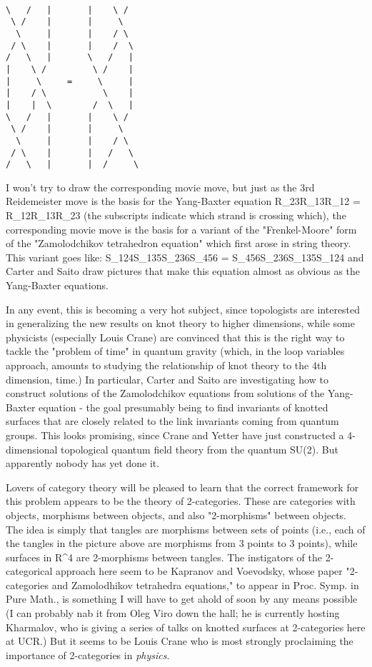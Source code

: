 \begin{verbatim}

\   /   |       |    \ /
 \ /    |       |     \
  \     |       |    / \
 / \    |       |    /  \
/   \   |       \   /   |
|    \ /         \ /    |
|     \     =     \     |
|    / \           \    |
|    |  \        /  \   |
\   /   |       |    \ /
 \ /    |       |     \
  \     |       |    / \
 / \    |       |   /   \
/   \   |       |  /     \
\end{verbatim}
    
I won't try to draw the corresponding movie move, but just as the
3rd Reidemeister move is the basis for the Yang-Baxter equation
R_{23}R_{13}R_{12} = R_{12}R_{13}R_{23} (the subscripts indicate
which strand is crossing which), the corresponding movie move is the
basis for a variant of the "Frenkel-Moore" form of the "Zamolodchikov 
tetrahedron equation" which first arose in string theory.  
This variant goes like:
S_{124}S_{135}S_{236}S_{456} = S_{456}S_{236}S_{135}S_{124}
and Carter and Saito draw pictures that make this equation almost as
obvious as the Yang-Baxter equations.

In any event, this is becoming a very hot subject, since topologists
are interested in generalizing the new results on knot theory to 
higher dimensions, while some physicists (especially Louis Crane)
are convinced that this is the right way to tackle the "problem of
time" in quantum gravity (which, in the loop variables approach, amounts
to studying the relationship of knot theory to the 4th dimension, time.)
In particular, Carter and Saito are investigating how to construct
solutions of the Zamolodchikov equations from solutions of the Yang-Baxter
equation - the goal presumably being to find invariants of knotted surfaces
that are closely related to the link invariants coming from quantum groups.
This looks promising, since Crane and Yetter have just constructed a
4-dimensional topological quantum field theory from the quantum SU(2).  
But apparently nobody has yet done it.  

Lovers of category theory will be pleased to learn that the correct framework 
for this problem appears to be the theory of 2-categories.  These are 
categories with objects, morphisms between objects, and also 
"2-morphisms" between objects.  The idea is simply that tangles are morphisms
between sets of points (i.e., each of the tangles in the picture above
are morphisms from 3 points to 3 points), while surfaces in R^4 are
2-morphisms between tangles.  The instigators of the 2-categorical
approach here seem to be Kapranov and Voevodsky, whose paper "2-categories
and Zamolodhikov tetrahedra equations," to appear in Proc. Symp. in Pure
Math., is something I will have to get ahold of soon by any means possible
(I can probably nab it from Oleg Viro down the hall; he is currently 
hosting Kharmalov, who is giving a series of talks on knotted surfaces
at 2-categories here at UCR.)  But it seems to be Louis Crane who is most
strongly proclaiming the importance of 2-categories in \emph{physics}.

